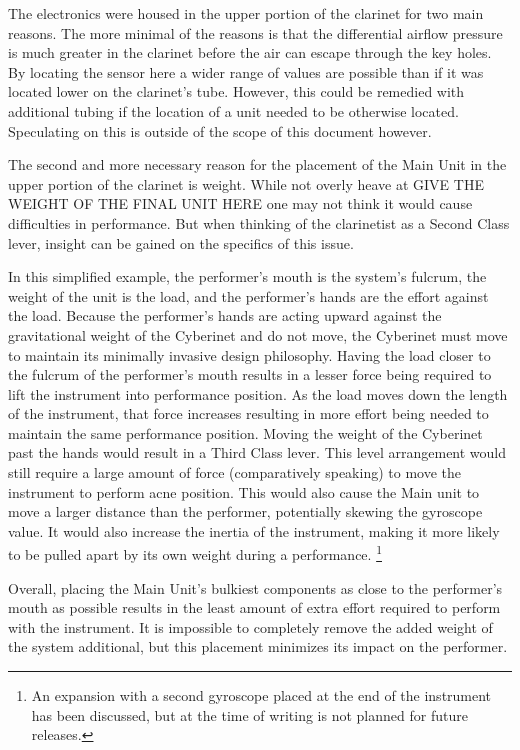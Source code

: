 The electronics were housed in the upper portion of the clarinet for two main reasons. The more minimal of the reasons is that the differential airflow pressure is much greater in the clarinet before the air can escape through the key holes. By locating the sensor here a wider range of values are possible than if it was located lower on the clarinet's tube. However, this could be remedied with additional tubing if the location of a unit needed to be otherwise located. Speculating on this is outside of the scope of this document however.

The second and more necessary reason for the placement of the Main Unit in the upper portion of the clarinet is weight. While not overly heave at GIVE THE WEIGHT OF THE FINAL UNIT HERE one may not think it would cause difficulties in performance. But when thinking of the clarinetist as a Second Class lever, insight can be gained on the specifics of this issue.

In this simplified example, the performer's mouth is the system's fulcrum, the weight of the unit is the load, and the performer's hands are the effort against the load. Because the performer's hands are acting upward against the gravitational weight of the Cyberinet and do not move, the Cyberinet must move to maintain its minimally invasive design philosophy. Having the load closer to the fulcrum of the performer's mouth results in a lesser force being required to lift the instrument into performance position\cite{Body Levers Webpage}. As the load moves down the length of the instrument, that force increases resulting in more effort being needed to maintain the same performance position. Moving the weight of the Cyberinet past the hands would result in a Third Class lever. This level arrangement would still require a large amount of force (comparatively speaking) to move the instrument to perform acne position\cite{Body Levers Webpage}. This would also cause the Main unit to move a larger distance than the performer, potentially skewing the gyroscope value\cite{Body Levers Webpage}. It would also increase the inertia of the instrument, making it more likely to be pulled apart by its own weight during a performance. \footnote{An expansion with a second gyroscope placed at the end of the instrument has been discussed, but at the time of writing is not planned for future releases.}

Overall, placing the Main Unit's bulkiest components as close to the performer's mouth as possible results in the least amount of extra effort required to perform with the instrument. It is impossible to completely remove the added weight of the system additional, but this placement minimizes its impact on the performer.

